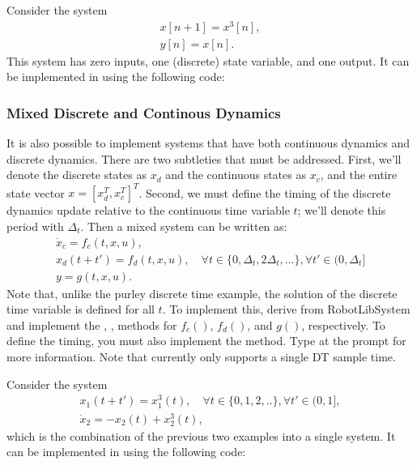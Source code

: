\begin{example}
Consider the system \begin{gather*}x[n+1] = x^3[n],\\ y[n] = x[n].\end{gather*}  This system has zero inputs, one (discrete) state variable, and one output.  It can be implemented in \robotlib using the following code:

\end{example}


\subsubsection{Mixed Discrete and Continous Dynamics}

It is also possible to implement systems that have both continuous
dynamics and discrete dynamics.  There are two subtleties that must be
addressed.  First, we'll denote the discrete states as $x_d$ and the
continuous states as $x_c$, and the entire state vector $x = [x_d^T,
x_c^T]^T$.  Second, we must define the timing of the discrete dynamics
update relative to the continuous time variable $t$; we'll denote this
period with $\Delta_t$.  Then a mixed system can be written
as:\begin{gather*} \dot{x}_c = f_c(t,x,u),\\ x_d(t+t') = f_d(t,x,u),
  \quad \forall t \in \{0,\Delta_t,2\Delta_t,...\},\forall t' \in
  (0,\Delta_t] \\ y=g(t,x,u). \end{gather*} Note that, unlike the
purley discrete time example, the solution of the discrete time variable is defined
for all $t$.  To implement this, derive from RobotLibSystem and
implement the , ,  methods
for $f_c()$, $f_d()$, and $g()$, respectively.  To define the timing,
you must also implement the  method.  Type
 at the \matlab prompt for
more information.  Note that currently \robotlib only supports a
single DT sample time. %

\begin{example}
Consider the system \begin{gather*}x_1(t+t') = x_1^3(t), \quad \forall
  t \in \{0,1,2,..\}, \forall t' \in (0,1], \\\dot{x}_2 =
  -x_2(t) + x_2^3(t), \end{gather*} which is the combination of the
previous two examples into a single system.  It can be implemented in \robotlib using the following code:

\end{example}

